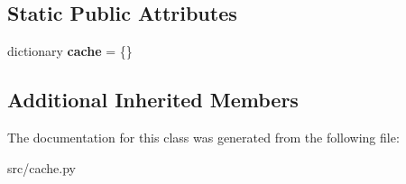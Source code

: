\subsection*{Static Public Attributes}
\begin{DoxyCompactItemize}
\item 
\hypertarget{classsrc_1_1cache_1_1_chunk_cache_a0488eace5e6eaa55065ce04472b7054d}{}\label{classsrc_1_1cache_1_1_chunk_cache_a0488eace5e6eaa55065ce04472b7054d} 
dictionary {\bfseries cache} = \{\}
\end{DoxyCompactItemize}
\subsection*{Additional Inherited Members}


The documentation for this class was generated from the following file\+:\begin{DoxyCompactItemize}
\item 
src/cache.\+py\end{DoxyCompactItemize}
